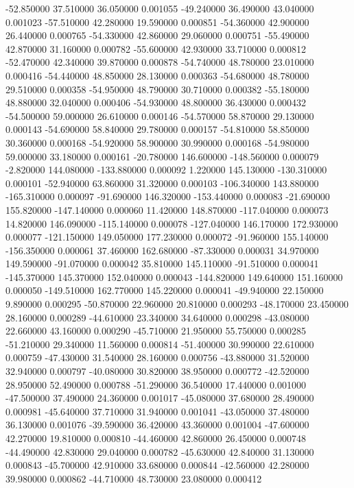 -52.850000 37.510000 36.050000 0.001055 
-49.240000 36.490000 43.040000 0.001023 
-57.510000 42.280000 19.590000 0.000851 
-54.360000 42.900000 26.440000 0.000765 
-54.330000 42.860000 29.060000 0.000751 
-55.490000 42.870000 31.160000 0.000782 
-55.600000 42.930000 33.710000 0.000812 
-52.470000 42.340000 39.870000 0.000878 
-54.740000 48.780000 23.010000 0.000416 
-54.440000 48.850000 28.130000 0.000363 
-54.680000 48.780000 29.510000 0.000358 
-54.950000 48.790000 30.710000 0.000382 
-55.180000 48.880000 32.040000 0.000406 
-54.930000 48.800000 36.430000 0.000432 
-54.500000 59.000000 26.610000 0.000146 
-54.570000 58.870000 29.130000 0.000143 
-54.690000 58.840000 29.780000 0.000157 
-54.810000 58.850000 30.360000 0.000168 
-54.920000 58.900000 30.990000 0.000168 
-54.980000 59.000000 33.180000 0.000161 
-20.780000 146.600000 -148.560000 0.000079 
-2.820000 144.080000 -133.880000 0.000092 
1.220000 145.130000 -130.310000 0.000101 
-52.940000 63.860000 31.320000 0.000103 
-106.340000 143.880000 -165.310000 0.000097 
-91.690000 146.320000 -153.440000 0.000083 
-21.690000 155.820000 -147.140000 0.000060 
11.420000 148.870000 -117.040000 0.000073 
14.820000 146.090000 -115.140000 0.000078 
-127.040000 146.170000 172.930000 0.000077 
-121.150000 149.050000 177.230000 0.000072 
-91.960000 155.140000 -156.350000 0.000061 
37.460000 162.680000 -87.330000 0.000031 
34.970000 149.590000 -91.070000 0.000042 
35.810000 145.110000 -91.510000 0.000041 
-145.370000 145.370000 152.040000 0.000043 
-144.820000 149.640000 151.160000 0.000050 
-149.510000 162.770000 145.220000 0.000041 
-49.940000 22.150000 9.890000 0.000295 
-50.870000 22.960000 20.810000 0.000293 
-48.170000 23.450000 28.160000 0.000289 
-44.610000 23.340000 34.640000 0.000298 
-43.080000 22.660000 43.160000 0.000290 
-45.710000 21.950000 55.750000 0.000285 
-51.210000 29.340000 11.560000 0.000814 
-51.400000 30.990000 22.610000 0.000759 
-47.430000 31.540000 28.160000 0.000756 
-43.880000 31.520000 32.940000 0.000797 
-40.080000 30.820000 38.950000 0.000772 
-42.520000 28.950000 52.490000 0.000788 
-51.290000 36.540000 17.440000 0.001000 
-47.500000 37.490000 24.360000 0.001017 
-45.080000 37.680000 28.490000 0.000981 
-45.640000 37.710000 31.940000 0.001041 
-43.050000 37.480000 36.130000 0.001076 
-39.590000 36.420000 43.360000 0.001004 
-47.600000 42.270000 19.810000 0.000810 
-44.460000 42.860000 26.450000 0.000748 
-44.490000 42.830000 29.040000 0.000782 
-45.630000 42.840000 31.130000 0.000843 
-45.700000 42.910000 33.680000 0.000844 
-42.560000 42.280000 39.980000 0.000862 
-44.710000 48.730000 23.080000 0.000412 
